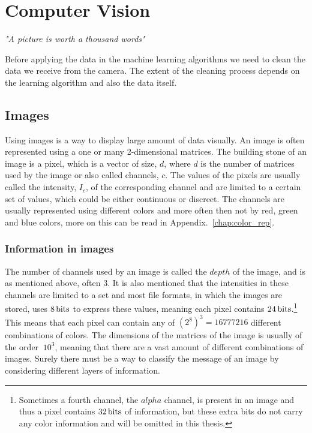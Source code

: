 \chapter{Computer Vision}
\begin{center}
\vspace{-6ex}
\textit{"A picture is worth a thousand words"}
\vspace{6ex}
\end{center}
\label{chap:imgPro}

Before applying the data in the machine learning algorithms we need to clean the data we receive from the camera. The extent of the cleaning process depends on the learning algorithm and also the data itself.

\section{Images}

Using images is a way to display large amount of data visually. An image is often represented using a one or many 2-dimensional matrices. The building stone of an image is a pixel, which is a vector of size, $d$, where $d$ is the number of matrices used by the image or also called channels, $c$. The values of the pixels are usually called the intensity, $I_c$, of the corresponding channel and are limited to a certain set of values, which could be either continuous or discreet. The channels are usually represented using different colors and more often then not by red, green and blue colors, more on this can be read in Appendix.~\ref{chap:color_rep}.

\subsection{Information in images}

The number of channels used by an image is called the $depth$ of the image, and is as mentioned above, often 3. It is also mentioned that the intensities in these channels are limited to a set and most file formats, in which the images are stored, uses $\unit[8]{bits}$ to express these values, meaning each pixel contains $\unit[24]{bits}$.\footnote{Sometimes a fourth channel, the $alpha$ channel, is present in an image and thus a pixel contains $\unit[32]{bits}$ of information, but these extra bits do not carry any color information and will be omitted in this thesis.} This means that each pixel can contain any of $(2^8)^3=16777216$ different combinations of colors. The dimensions of the matrices of the image is usually of the order $~10^3$, meaning that there are a vast amount of different combinations of images. Surely there must be a way to classify the message of an image by considering different layers of information.

